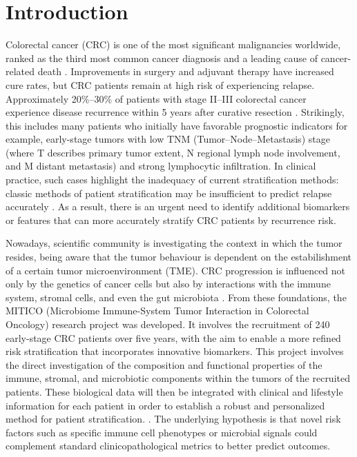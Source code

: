 \chapter{Introduction}

Colorectal cancer (CRC) is one of the most significant malignancies worldwide, ranked as the third most common cancer diagnosis and a leading cause of cancer-related death \cite{bray2024globocan,iarcglobocan2022factsheet}. Improvements in surgery and adjuvant therapy have increased cure rates, but CRC patients remain at high risk of experiencing relapse. Approximately 20\%--30\% of patients with stage II--III colorectal cancer experience disease recurrence within 5 years after curative resection \cite{boute2024outcomes,nors2024recurrence}. Strikingly, this includes many patients who initially have favorable prognostic indicators for example, early-stage tumors with low TNM (Tumor--Node--Metastasis) stage (where T describes primary tumor extent, N regional lymph node involvement, and M distant metastasis) and strong lymphocytic infiltration. In clinical practice, such cases highlight the inadequacy of current stratification methods: classic methods of patient stratification may be insufficient to predict relapse accurately \cite{manzo2022}. As a result, there is an urgent need to identify additional biomarkers or features that can more accurately stratify CRC patients by recurrence risk.

Nowadays, scientific community is investigating the context in which the tumor resides, being aware that the tumor behaviour is dependent on the estabilishment of a certain tumor microenvironment (TME). CRC progression is influenced not only by the genetics of cancer cells but also by interactions with the immune system, stromal cells, and even the gut microbiota \cite{roelands2023atlas}. From these foundations, the MITICO (Microbiome Immune-System Tumor Interaction in Colorectal Oncology) research project was developed. It involves the recruitment of 240 early-stage CRC patients over five years, with the aim  to enable a more refined risk stratification that incorporates innovative biomarkers. This project involves the direct investigation of the composition and functional properties of the immune, stromal,  and microbiotic components within the tumors of the recruited patients. These biological data will then be integrated with clinical and lifestyle information for each patient in order to establish a robust and personalized method for patient stratification. \cite{mitico}. The underlying hypothesis is that novel risk factors such as specific immune cell phenotypes or microbial signals could complement standard clinicopathological metrics to better predict outcomes.

